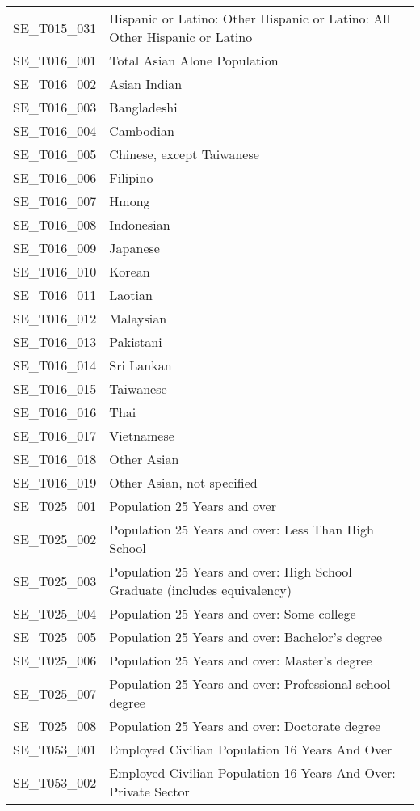 \begin{longtable}{rp{5in}}
  SE\_T015\_031 & Hispanic or Latino: Other Hispanic or Latino: All Other Hispanic or Latino \\ 
  SE\_T016\_001 & Total Asian Alone Population \\ 
  SE\_T016\_002 & Asian Indian \\ 
  SE\_T016\_003 & Bangladeshi \\ 
  SE\_T016\_004 & Cambodian \\ 
  SE\_T016\_005 & Chinese, except Taiwanese \\ 
  SE\_T016\_006 & Filipino \\ 
  SE\_T016\_007 & Hmong \\ 
  SE\_T016\_008 & Indonesian \\ 
  SE\_T016\_009 & Japanese \\ 
  SE\_T016\_010 & Korean \\ 
  SE\_T016\_011 & Laotian \\ 
  SE\_T016\_012 & Malaysian \\ 
  SE\_T016\_013 & Pakistani \\ 
  SE\_T016\_014 & Sri Lankan \\ 
  SE\_T016\_015 & Taiwanese \\ 
  SE\_T016\_016 & Thai \\ 
  SE\_T016\_017 & Vietnamese \\ 
  SE\_T016\_018 & Other Asian \\ 
  SE\_T016\_019 & Other Asian, not specified \\ 
  SE\_T025\_001 & Population 25 Years and over \\ 
  SE\_T025\_002 & Population 25 Years and over: Less Than High School \\ 
  SE\_T025\_003 & Population 25 Years and over: High School Graduate (includes equivalency) \\ 
  SE\_T025\_004 & Population 25 Years and over: Some college \\ 
  SE\_T025\_005 & Population 25 Years and over: Bachelor's degree \\ 
  SE\_T025\_006 & Population 25 Years and over: Master's degree \\ 
  SE\_T025\_007 & Population 25 Years and over: Professional school degree \\ 
  SE\_T025\_008 & Population 25 Years and over: Doctorate degree \\ 
  SE\_T053\_001 & Employed Civilian Population 16 Years And Over \\ 
  SE\_T053\_002 & Employed Civilian Population 16 Years And Over: Private Sector \\ 

\end{longtable}
